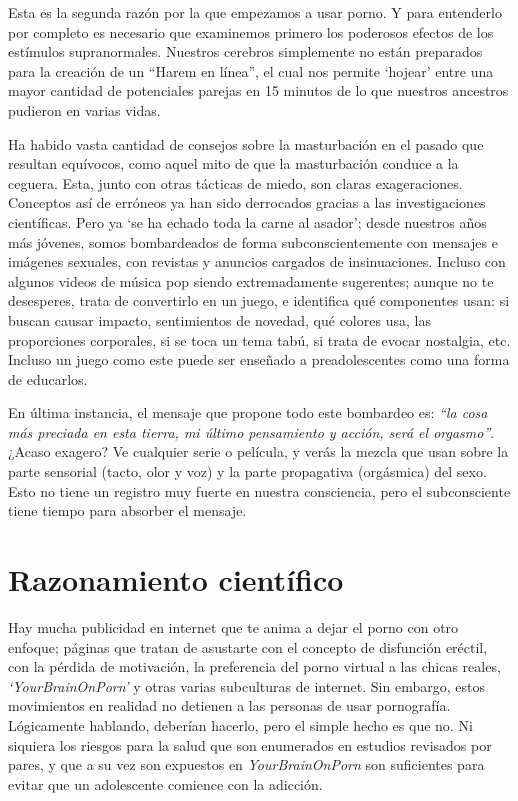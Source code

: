 \documentclass[
  spanish,
  openany]{book}
\begin{document}
Esta es la segunda razón por la que empezamos a usar porno. Y para entenderlo por completo es necesario que examinemos primero los poderosos efectos de los estímulos supranormales. Nuestros cerebros simplemente no están preparados para la creación de un ``Harem en línea'', el cual nos permite `hojear' entre una mayor cantidad de potenciales parejas en 15 minutos de lo que nuestros ancestros pudieron en varias vidas.

Ha habido vasta cantidad de consejos sobre la masturbación en el pasado que resultan equívocos, como aquel mito de que la masturbación conduce a la ceguera. Esta, junto con otras tácticas de miedo, son claras exageraciones. Conceptos así de erróneos ya han sido derrocados gracias a las investigaciones científicas. Pero ya `se ha echado toda la carne al asador'; desde nuestros años más jóvenes, somos bombardeados de forma subconscientemente con mensajes e imágenes sexuales, con revistas y anuncios cargados de insinuaciones. Incluso con algunos videos de música pop siendo extremadamente sugerentes; aunque no te desesperes, trata de convertirlo en un juego, e identifica qué componentes usan: si buscan causar impacto, sentimientos de novedad, qué colores usa, las proporciones corporales, si se toca un tema tabú, si trata de evocar nostalgia, etc. Incluso un juego como este puede ser enseñado a preadolescentes como una forma de educarlos.

En última instancia, el mensaje que propone todo este bombardeo es: \emph{``la cosa más preciada en esta tierra, mi último pensamiento y acción, será el orgasmo''}. ¿Acaso exagero? Ve cualquier serie o película, y verás la mezcla que usan sobre la parte sensorial (tacto, olor y voz) y la parte propagativa (orgásmica) del sexo. Esto no tiene un registro muy fuerte en nuestra consciencia, pero el subconsciente tiene tiempo para absorber el mensaje.

\hypertarget{razonamiento-cientuxedfico}{%
\section{Razonamiento científico}\label{razonamiento-cientuxedfico}}

Hay mucha publicidad en internet que te anima a dejar el porno con otro enfoque; páginas que tratan de asustarte con el concepto de disfunción eréctil, con la pérdida de motivación, la preferencia del porno virtual a las chicas reales, \emph{`YourBrainOnPorn'} y otras varias subculturas de internet. Sin embargo, estos movimientos en realidad no detienen a las personas de usar pornografía. Lógicamente hablando, deberían hacerlo, pero el simple hecho es que no. Ni siquiera los riesgos para la salud que son enumerados en estudios revisados por pares, y que a su vez son expuestos en \emph{YourBrainOnPorn} son suficientes para evitar que un adolescente comience con la adicción.
\end{document}
